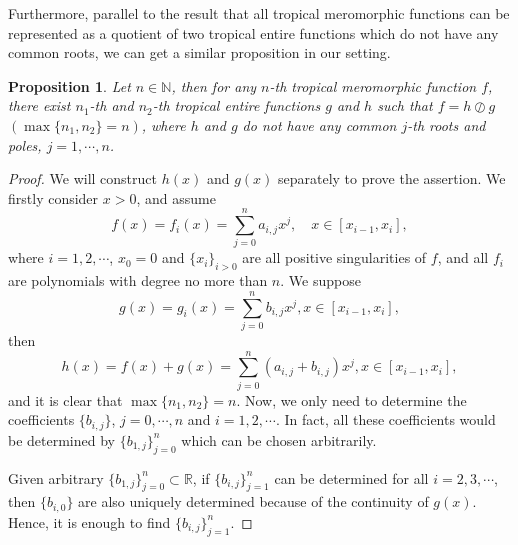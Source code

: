 \documentclass{article}
\newtheorem{proposition}[defin]{Proposition}
\begin{document}
Furthermore, parallel to the result that all tropical meromorphic functions can be represented as a quotient of two tropical entire functions which do not have any common roots, we can get a similar proposition in our setting.

\begin{proposition}\label{2p2.3}
    Let $n\in\mathbb{N}$, then for any $n$-th tropical meromorphic function $f$, there exist $n_{1}$-th and $n_{2}$-th tropical entire functions $g$ and $h$ such that $f=h\oslash g$ $(\max\{n_{1}, n_{2}\}= n )$, where $h$ and $g$ do not have any common $j$-th roots and poles, $j=1, \cdots, n$.
\end{proposition}

\begin{proof}
    We will construct $h(x)$ and $g(x)$ separately to prove the assertion. We firstly consider $x>0$, and assume
    \begin{equation*}
    f(x)=f_{i}(x)=\sum_{j=0}^{n}a_{i, j}x^{j}, \quad x\in [x_{i-1}, x_{i}],
    \end{equation*}
    where $i=1, 2, \cdots$, $x_{0}=0$ and $\{x_{i}\}_{i>0}$ are all positive singularities of $f$, and all $f_{i}$ are polynomials with degree no more than $n$. We suppose
    \begin{equation}\label{2a31}
        g(x)=g_{i}(x)=\sum_{j=0}^{n}b_{i, j}x^{j}, x\in [x_{i-1}, x_{i}],
    \end{equation}
    then
    \begin{equation}\label{2a32}
        h(x)=f(x)+g(x)=\sum_{j=0}^{n}(a_{i, j}+b_{i, j})x^{j}, x\in [x_{i-1}, x_{i}],
    \end{equation}
    and it is clear that $\max\{n_{1}, n_{2}\}=n$. Now, we only need to determine the coefficients $\{b_{i, j}\}$, $j=0, \cdots, n$ and $i=1, 2, \cdots$. In fact, all these coefficients would be determined by $\{b_{1, j}\}_{j=0}^{n}$ which can be chosen arbitrarily. 
    
    Given arbitrary $\{b_{1, j}\}_{j=0}^{n}\subset\mathbb{R}$, if $\{b_{i, j}\}_{j=1}^{n}$ can be determined for all $i=2, 3, \cdots$, then $\{b_{i, 0}\}$ are also uniquely determined because of the continuity of $g(x)$. Hence, it is enough to find $\{b_{i, j}\}_{j=1}^{n}$. 
    

\end{proof}
\end{document}
